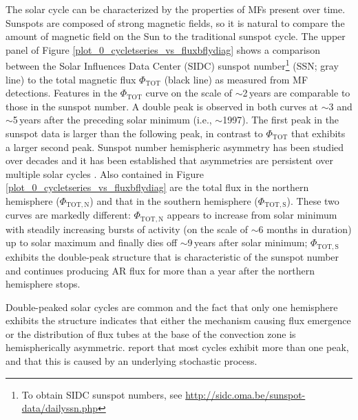 \documentclass[namedreferences]{solarphysics}
\begin{document}
\begin{article}
The solar cycle can be characterized by the properties of MFs present over time. Sunspots are composed of strong magnetic fields, so it is natural to compare the amount of magnetic field on the Sun to the traditional sunspot cycle. The upper panel of Figure \ref{plot_0_cycletseries_vs_fluxbflydiag} shows a comparison between the Solar Influences Data Center (SIDC) sunspot number\footnote{To obtain SIDC sunspot numbers, see \url{http://sidc.oma.be/sunspot-data/dailyssn.php}} (SSN; gray line) to the total magnetic flux $\Phi_{\mathrm{TOT}}$ (black line) as measured from MF detections. Features in the $\Phi_{\mathrm{TOT}}$ curve on the scale of $\sim$2\,years are comparable to those in the sunspot number. A double peak is observed in both curves at $\sim$3 and $\sim$5\,years after the preceding solar minimum (i.e., $\sim$1997). The first peak in the sunspot data is larger than the following peak, in contrast to $\Phi_{\mathrm{TOT}}$ that exhibits a larger second peak. Sunspot number hemispheric asymmetry has been studied over decades \citep{Li:2001a,Temmer:2002} and it has been established that asymmetries are persistent over multiple solar cycles \citep{Temmer:2006}. Also contained in Figure\,\ref{plot_0_cycletseries_vs_fluxbflydiag} are the total flux in the northern hemisphere ($\Phi_\mathrm{TOT,N}$) and that in the southern hemisphere ($\Phi_\mathrm{TOT,S}$). These two curves are markedly different: $\Phi_\mathrm{TOT,N}$ appears to increase from solar minimum with steadily increasing bursts of activity (on the scale of $\sim$6 months in duration) up to solar maximum and finally dies off $\sim$9\,years after solar minimum; $\Phi_\mathrm{TOT,S}$ exhibits the double-peak structure that is characteristic of the sunspot number and continues producing AR flux for more than a year after the northern hemisphere stops. 


Double-peaked solar cycles are common \citep{gnevyshev:1977} and the fact that only one hemisphere exhibits the structure indicates that either the mechanism causing flux emergence or the distribution of flux tubes at the base of the convection zone is hemispherically asymmetric. 
\citet{wang:2003a} report that most cycles exhibit more than one peak, and that this is caused by an underlying stochastic process.


\begin{figure*}[!t]
 

\end{figure*}
\end{article}
\end{document}
